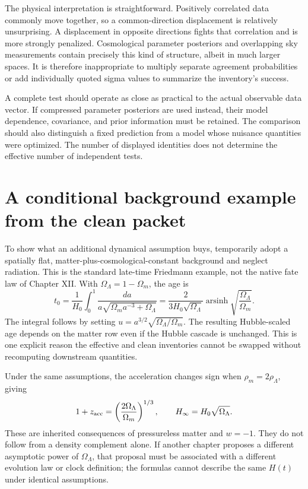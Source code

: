 The physical interpretation is straightforward. Positively correlated data commonly move together, so a common-direction displacement is relatively unsurprising. A displacement in opposite directions fights that correlation and is more strongly penalized. Cosmological parameter posteriors and overlapping sky measurements contain precisely this kind of structure, albeit in much larger spaces. It is therefore inappropriate to multiply separate agreement probabilities or add individually quoted sigma values to summarize the inventory's success.

A complete test should operate as close as practical to the actual observable data vector. If compressed parameter posteriors are used instead, their model dependence, covariance, and prior information must be retained. The comparison should also distinguish a fixed prediction from a model whose nuisance quantities were optimized. The number of displayed identities does not determine the effective number of independent tests.

\section{A conditional background example from the clean packet}
To show what an additional dynamical assumption buys, temporarily adopt a spatially flat, matter-plus-cosmological-constant background and neglect radiation. This is the standard late-time Friedmann example, not the native fate law of Chapter XII. With $\Omega_\Lambda=1-\Omega_m$, the age is
\begin{equation}
 t_0=\frac1{H_0}\int_0^1
 \frac{da}{a\sqrt{\Omega_ma^{-3}+\Omega_\Lambda}}
 =\frac{2}{3H_0\sqrt{\Omega_\Lambda}}
 \operatorname{arsinh}\sqrt{\frac{\Omega_\Lambda}{\Omega_m}}.
 \label{c8:age}
\end{equation}
The integral follows by setting $u=a^{3/2}\sqrt{\Omega_\Lambda/\Omega_m}$. The resulting Hubble-scaled age depends on the matter row even if the Hubble cascade is unchanged. This is one explicit reason the effective and clean inventories cannot be swapped without recomputing downstream quantities.

Under the same assumptions, the acceleration changes sign when $\rho_m=2\rho_\Lambda$, giving
\begin{equation}
 1+z_{\rm acc}=\left(\frac{2\Omega_\Lambda}{\Omega_m}\right)^{1/3},
 \qquad H_\infty=H_0\sqrt{\Omega_\Lambda}.
 \label{c8:lateexample}
\end{equation}
These are inherited consequences of pressureless matter and $w=-1$. They do not follow from a density complement alone. If another chapter proposes a different asymptotic power of $\Omega_\Lambda$, that proposal must be associated with a different evolution law or clock definition; the formulas cannot describe the same $H(t)$ under identical assumptions.

